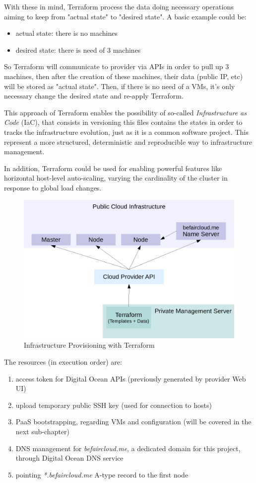 With these in mind, Terraform process the data doing necessary operations aiming to keep from "actual state" to "desired state".  A basic example could be:
\begin{itemize}
\item actual state:  there is no machines
\item desired state:  there is need of 3 machines
\end{itemize}

So Terraform will communicate to provider via APIs in order to pull up 3 machines, then after the creation of these machines, their data (public IP, etc) will be stored as "actual state".  Then, if there is no need of a VMs, it's only necessary change the desired state and re-apply Terraform.

This approach of Terraform enables the possibility of so-called \textit{Infrastructure as Code} (IaC), that consists in versioning this files contains the states in order to tracks the infrastructure evolution, just as it is a common software project.  This represent a more structured, deterministic and reproducible way to infrastructure management.

In addition, Terraform could be used for enabling powerful features like horizontal host-level auto-scaling, varying the cardinality of the cluster in response to global load changes.

\begin{figure}[htbp]
\centering
\includegraphics{media/ch4-terraform.png}
\caption{Infrastructure Provisioning with Terraform}
\end{figure}

The resources (in execution order) are:
\begin{enumerate}
\item access token for Digital Ocean APIs (previously generated by provider Web UI)
\item upload temporary public SSH key (used for connection to hosts)
\item PaaS bootstrapping, regarding VMs and configuration (will be covered in the next sub-chapter)
\item DNS management for \textit{befaircloud.me}, a dedicated domain for this project, through Digital Ocean DNS service
\item pointing \textit{*.befaircloud.me} A-type record to the first node
\end{enumerate}

